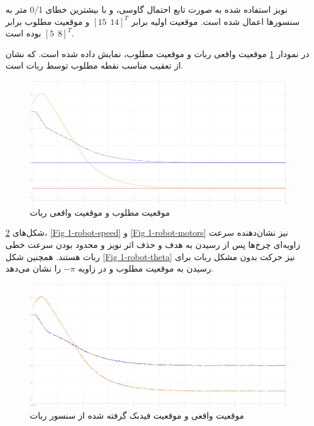  نویز استفاده شده به صورت تابع احتمال گاوسی، و با بیشترین خطای 0/1 متر به سنسورها اعمال شده است. موقعیت اولیه برابر $[15~~14]^T$ و موقعیت مطلوب برابر $[5~~8]^T$ بوده است.
 
در نمودار \ref{Fig 1-robot-pos} موقعیت واقعی ربات و موقعیت مطلوب، نمایش داده شده است. که نشان از تعقیب مناسب نقطه مطلوب توسط ربات است.
 \begin{figure}[!h] 
 	\centering
 	\includegraphics[scale=0.12]{Images/1-robot pos.jpg}
 	\caption{موقعیت مطلوب و موقعیت واقعی ربات} \label{Fig 1-robot-pos}
 \end{figure}
 
 شکل‌های \ref{Fig 1-robot-noise}، \ref{Fig 1-robot-speed} و \ref{Fig 1-robot-motors} نیز نشان‌دهنده سرعت زاویه‌ای چرخ‌ها پس از رسیدن به هدف و حذف اثر نویز و محدود بودن سرعت خطی ربات هستند. همچنین شکل \ref{Fig 1-robot-theta} نیز حرکت بدون مشکل ربات برای رسیدن به موقعیت مطلوب و در زاویه $-\pi$ را نشان می‌دهد.
 
 \begin{figure}[!h] 
 	\centering
 	\includegraphics[scale=0.12]{Images/1-robot noise.jpg}
 	\caption{موقعیت واقعی و موقعیت فیدبک گرفته شده از سنسور ربات} \label{Fig 1-robot-noise}
 \end{figure}
 
